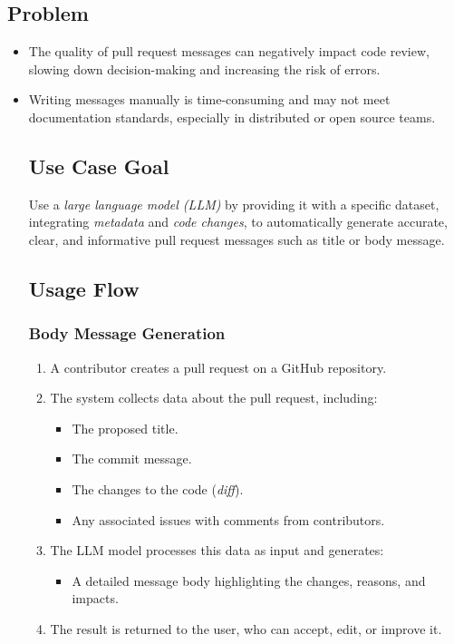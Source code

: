 \subsection{Problem}
\begin{itemize}
	\item The quality of pull request messages can negatively impact code review, slowing down decision-making and increasing the risk of errors.
	\item Writing messages manually is time-consuming and may not meet documentation standards, especially in distributed or open source teams.
	\subsection{Use Case Goal}
	Use a \textit{large language model (LLM)} by providing it with a specific dataset, integrating \textit{metadata} and \textit{code changes}, to automatically generate accurate, clear, and informative pull request messages such as title or body message.
	\subsection{Usage Flow}
	\subsubsection{Body Message Generation}
	\begin{enumerate}
		\item A contributor creates a pull request on a GitHub repository.
		\item The system collects data about the pull request, including:
		\begin{itemize}
			\item The proposed title.
			\item The commit message.
			\item The changes to the code (\textit{diff}).
			\item Any associated issues with comments from contributors.
		\end{itemize}
		\item The LLM model processes this data as input and generates:
		\begin{itemize}
			\item A detailed message body highlighting the changes, reasons, and impacts.
		\end{itemize}
		\item The result is returned to the user, who can accept, edit, or improve it.
	\end{enumerate}

\end{itemize}
